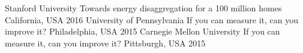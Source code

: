 
\begin{cvhonors}
	 \cvhonor
	 {Stanford University}
	 {Towards energy disaggregation for a 100 million homes}
	 {California, USA}
	 {2016}
  \cvhonor
    {University of Pennsylvania}
    {If you can measure it, can you improve it?}
    {Philadelphia, USA}
    {2015}
  \cvhonor
   {Carnegie Mellon University}
   {If you can measure it, can you improve it?}
   {Pittsburgh, USA}
   {2015}
 \end{cvhonors}
